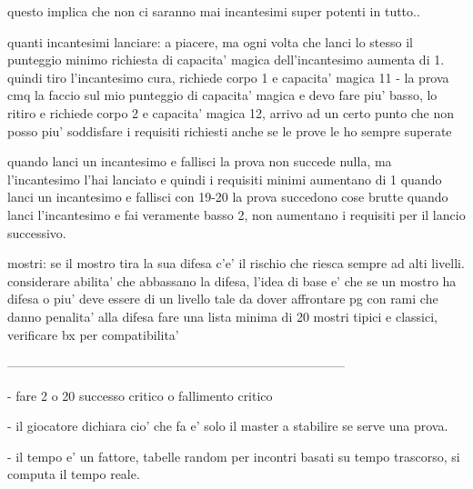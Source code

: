 \documentclass[12pt,a4paper,twoside,openany,twocolumn]{book}
\begin{document}
questo implica che non ci saranno mai incantesimi super potenti in tutto..

quanti incantesimi lanciare:  a piacere, ma ogni volta che lanci lo stesso il punteggio minimo richiesta di capacita' magica dell'incantesimo aumenta di 1. quindi tiro l'incantesimo cura, richiede corpo 1 e capacita' magica 11 - la prova cmq la faccio sul mio punteggio di capacita' magica e devo fare piu' basso, lo ritiro e richiede corpo 2 e capacita' magica 12, arrivo ad un certo punto che non posso piu' soddisfare i requisiti richiesti anche se le prove le ho sempre superate

quando lanci un incantesimo e fallisci la prova non succede nulla, ma l'incantesimo l'hai lanciato e quindi i requisiti minimi aumentano di 1
quando lanci un incantesimo e fallisci con 19-20 la prova succedono cose  brutte
quando lanci l'incantesimo e fai veramente basso 2, non aumentano i requisiti per il lancio successivo.


mostri:
se il mostro tira la sua difesa c'e' il rischio che riesca sempre ad alti livelli. considerare abilita' che abbassano la difesa, l'idea di base e' che se un mostro ha difesa  o piu' deve essere di un livello tale da dover affrontare pg con rami che danno penalita' alla difesa
fare una lista minima di 20 mostri tipici e classici, verificare bx per compatibilita'


--------------------------------------------------------------------------------



- fare 2 o 20  successo critico o fallimento  critico

- il giocatore dichiara cio' che fa e' solo il master a stabilire se serve una prova. 

- il tempo e' un fattore, tabelle random per incontri basati su tempo trascorso, si computa il tempo reale.
\end{document}
